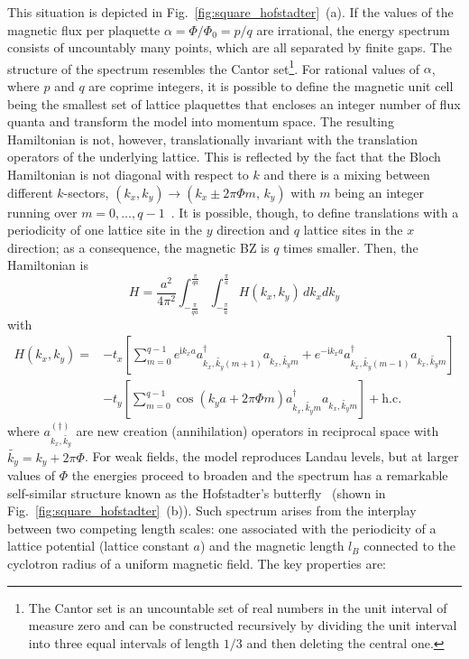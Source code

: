 This situation is depicted in Fig.~\ref{fig:square_hofstadter}~(a). If the values of the magnetic flux per plaquette $\alpha = \Phi / \Phi_0 = p / q$ are irrational, the energy spectrum consists of uncountably many points, which are all separated by finite gaps. The structure of the spectrum resembles the Cantor set\footnote{The Cantor set is an uncountable set of real numbers in the unit interval of measure zero and can be constructed recursively by dividing the unit interval into three equal intervals of length $1/3$ and then deleting the central one.}. For rational values of $\alpha$, where $p$ and $q$ are coprime integers, it is possible to define the magnetic unit cell being the smallest set of lattice plaquettes that encloses an integer number of flux quanta and transform the model into momentum space. The resulting Hamiltonian is not, however, translationally invariant with the translation operators of the underlying lattice. This is reflected by the fact that the Bloch Hamiltonian is not diagonal with respect to $k$ and there is a mixing between different $k$-sectors, $(k_x, k_y) \rightarrow (k_x \pm 2 \pi \Phi m, \, k_y)$ with $m$ being an integer running over $m = 0, \ldots, q-1$~\cite{bernevig2013topological}. It is possible, though, to define translations with a periodicity of one lattice site in the $y$ direction and $q$ lattice sites in the $x$ direction; as a consequence, the magnetic BZ is $q$ times smaller. Then, the Hamiltonian is 
\begin{equation}
H = \frac{a^2}{4 \pi^2} \int_{- \frac{\pi}{qa}}^{\frac{\pi}{qa}} \int_{- \frac{\pi}{a} }^{\frac{\pi}{a}} H(k_x, k_y) \, d k_x d k_y
\label{eq:hofstadter_bloch1}
\end{equation}
with
\begin{equation}
\begin{aligned}
H (k_x, k_y)  =  &-t_x  \left[ \sum_{m =0}^{q-1} e^{\mathrm{i} k_x a} a^{\dagger}_{k_x, \tilde{k_y} (m + 1)}   a_{k_x, \tilde{k_y} m} + e^{- \mathrm{i} k_x a}  a^{\dagger}_{k_x,\tilde{k_y} (m - 1)} a_{k_x, \tilde{k_y}  m} \right] \\
& -t_y \left[ \sum_{m =0}^{q-1} \cos(k_y a + 2 \pi \Phi m)  a^{\dagger}_{k_x,\tilde{k_y} m }   a_{k_x, \tilde{k_y}  m} \right] + \mathrm{h. c.} 
\end{aligned}
\label{eq:hofstadter_bloch2}
\end{equation} 
where $a^{(\dagger)}_{k_x, \tilde{k_y}}$ are new creation (annihilation) operators in reciprocal space with $\tilde{k_y} = k_y + 2 \pi \Phi$. For weak fields, the model reproduces Landau levels, but at larger values of $\Phi$ the energies proceed to broaden and the spectrum has a remarkable self-similar structure known as the Hofstadter's butterfly~\cite{1976:Hofstadter} (shown in Fig.~\ref{fig:square_hofstadter}~(b)). Such spectrum arises from the interplay between two competing length scales: one associated with the periodicity of a lattice potential (lattice constant $a$) and the magnetic length $l_B$ connected to the cyclotron radius of a uniform magnetic field. The key properties are:

